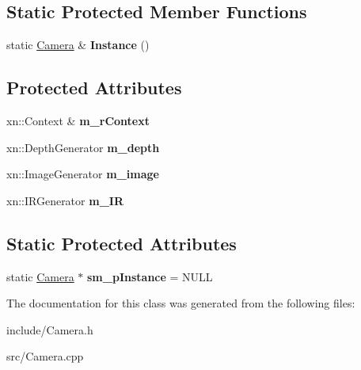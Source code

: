 \subsection*{Static Protected Member Functions}
\begin{DoxyCompactItemize}
\item 
\hypertarget{classCamera_ac9c55b0a8dd6f567cc1b50f7196115ca}{static \hyperlink{classCamera}{Camera} \& {\bfseries Instance} ()}\label{classCamera_ac9c55b0a8dd6f567cc1b50f7196115ca}

\end{DoxyCompactItemize}
\subsection*{Protected Attributes}
\begin{DoxyCompactItemize}
\item 
\hypertarget{classCamera_a197283462b00c4fffa45696390f520f5}{xn\-::\-Context \& {\bfseries m\-\_\-r\-Context}}\label{classCamera_a197283462b00c4fffa45696390f520f5}

\item 
\hypertarget{classCamera_aae0d8e13ff6056d475eec5aa819a26c2}{xn\-::\-Depth\-Generator {\bfseries m\-\_\-depth}}\label{classCamera_aae0d8e13ff6056d475eec5aa819a26c2}

\item 
\hypertarget{classCamera_a9cd7ea9a0574f906aa9285e3629f45ac}{xn\-::\-Image\-Generator {\bfseries m\-\_\-image}}\label{classCamera_a9cd7ea9a0574f906aa9285e3629f45ac}

\item 
\hypertarget{classCamera_afe6232303a146d1da13cbf0b3ae7584c}{xn\-::\-I\-R\-Generator {\bfseries m\-\_\-\-I\-R}}\label{classCamera_afe6232303a146d1da13cbf0b3ae7584c}

\end{DoxyCompactItemize}
\subsection*{Static Protected Attributes}
\begin{DoxyCompactItemize}
\item 
\hypertarget{classCamera_a696c4f46f01f34f959e15de32d1a9c72}{static \hyperlink{classCamera}{Camera} $\ast$ {\bfseries sm\-\_\-p\-Instance} = N\-U\-L\-L}\label{classCamera_a696c4f46f01f34f959e15de32d1a9c72}

\end{DoxyCompactItemize}


The documentation for this class was generated from the following files\-:\begin{DoxyCompactItemize}
\item 
include/Camera.\-h\item 
src/Camera.\-cpp\end{DoxyCompactItemize}
